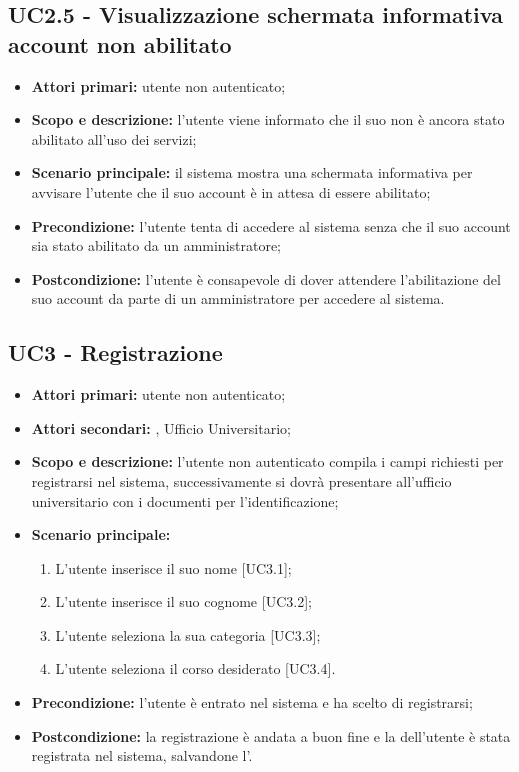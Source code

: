 \documentclass[AnalisiDeiRequisiti.tex]{subfiles}
\begin{document}
\subsection{UC2.5 - Visualizzazione schermata informativa account non abilitato}
\begin{itemize}
	\item \textbf{Attori primari:} utente non autenticato;
	\item \textbf{Scopo e descrizione:} l'utente viene informato che il suo  non è ancora stato abilitato all'uso dei servizi;
	\item \textbf{Scenario principale:} il sistema mostra una schermata informativa per avvisare l'utente che il suo account è in attesa di essere abilitato;
	\item \textbf{Precondizione:} l'utente tenta di accedere al sistema senza che il suo account sia stato abilitato da un amministratore;
	\item \textbf{Postcondizione:} l'utente è consapevole di dover attendere l'abilitazione del suo account da parte di un amministratore per accedere al sistema.
\end{itemize}
\subsection{UC3 - Registrazione}
\begin{itemize}
	\item \textbf{Attori primari:} utente non autenticato;
	\item \textbf{Attori secondari:} , Ufficio Universitario;
	\item \textbf{Scopo e descrizione:} l'utente non autenticato compila i campi richiesti per registrarsi nel sistema, successivamente si dovrà presentare all'ufficio universitario con i documenti per l'identificazione;
	\item \textbf{Scenario principale:}
	\begin{enumerate}
		\item L'utente inserisce il suo nome [UC3.1];
		\item L'utente inserisce il suo cognome [UC3.2];
		\item L'utente seleziona la sua categoria [UC3.3];
		\item L'utente seleziona il corso desiderato [UC3.4].
	\end{enumerate}
	\item \textbf{Precondizione:} l'utente è entrato nel sistema e ha scelto di registrarsi;
	\item \textbf{Postcondizione:} la registrazione è andata a buon fine e la  dell'utente è stata registrata nel sistema, salvandone l'.
\end{itemize}
\end{document}
